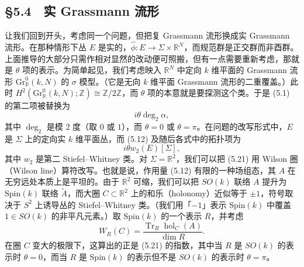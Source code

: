 
\subsection*{§5.4　实 Grassmann 流形}

让我们回到开头，考虑同一个问题，但把复 Grassmann 流形换成实 Grassmann 流形。在那种情形下丛 $E$ 是实的，$\hat\phi:E\to\Sigma\times\mathbb{R}^N$，而规范群是正交群而非酉群。上面推导的大部分只需作相对显然的改动便可照搬，但有一点需要重新考虑，那就是 $\theta$ 项的表示。为简单起见，我们考虑映入 $\mathbb{R}^N$ 中定向 $k$ 维平面的 Grassmann 流形 $\mathrm{Gr}^0_{\mathbb{R}}(k,N)$ 的 $\sigma$ 模型。（它是无向 $k$ 维平面 Grassmann 流形的二重覆盖。）此时 $H^2(\mathrm{Gr}^0_{\mathbb{R}}(k,N);\mathbb{Z})\cong\mathbb{Z}/2\mathbb{Z}$，而 $\theta$ 项的本意就是要探测这个类。于是 (5.1) 的第二项被替换为
\[
  i\theta\deg_2\alpha,
\]
其中 $\deg_2$ 是模 $2$ 度（取 $0$ 或 $1$），而 $\theta=0$ 或 $\theta=\pi$。在问题的改写形式中，$E$ 是 $\Sigma$ 上的定向实 $k$ 维平面丛，而 (5.12) 及随后各式中的拓扑项为
\begin{equation}
  \tag{5.21}
  \label{eq:5-21}
  i\theta w_2(E)[\Sigma],
\end{equation}
其中 $w_2$ 是第二 Stiefel–Whitney 类。对 $\Sigma=\mathbb{R}^2$，我们可以把 (5.21) 用 Wilson 圈（Wilson line）算符改写。也就是说，作用量 (5.12) 有限的一种场组态，其 $A$ 在无穷远处本质上是平坦的。由于 $\mathbb{R}^2$ 可缩，我们可以把 $SO(k)$ 联络 $A$ 提升为 $\mathrm{Spin}(k)$ 联络 $\tilde A$，而大圈 $C\subset\mathbb{R}^2$ 上的和乐（holonomy）近似等于 $\pm1$，符号取决于 $S^2$ 上诱导丛的 Stiefel–Whitney 类。（我们用「$-1$」表示 $\mathrm{Spin}(k)$ 中覆盖 $1\in SO(k)$ 的非平凡元素。）取 $\mathrm{Spin}(k)$ 的一个表示 $R$，并考虑
\begin{equation}
  \tag{5.22}
  \label{eq:5-22}
  W_R(C)=\frac{\operatorname{Tr}_R\operatorname{hol}_C(A)}{\dim R}.
\end{equation}
在圈 $C$ 变大的极限下，这算出的正是 (5.21) 的指数，其中当 $R$ 是 $SO(k)$ 的表示时 $\theta=0$，而当 $R$ 是 $\mathrm{Spin}(k)$ 的表示但不是 $SO(k)$ 的表示时 $\theta=\pi$。

